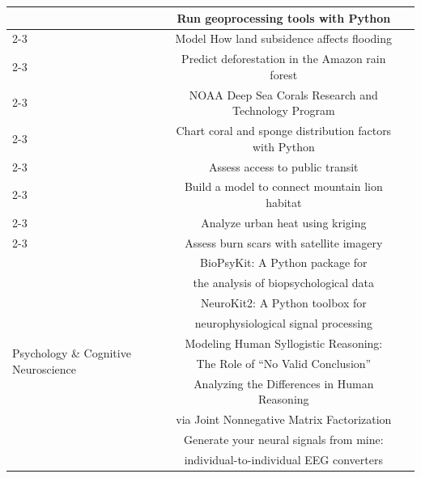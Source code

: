 \begin{table}[h]
\begin{tabular}{lcc}
 & Run geoprocessing tools with Python & \citet{Zandbergen_2024} \\
\cmidrule(lr){2-3}

 & Model How land subsidence affects flooding & \citet{Andeweg_Kuijpers_2024} \\
\cmidrule(lr){2-3}

 & Predict deforestation in the Amazon rain forest & \citet{ESRI_2024} \\
\cmidrule(lr){2-3}

 & NOAA Deep Sea Corals Research and Technology Program & \citet{hourigan-2023} \\
\cmidrule(lr){2-3}

 & Chart coral and sponge distribution factors with Python & \citet{Robinson_2023} \\
\cmidrule(lr){2-3}

 & Assess access to public transit & \citet{ESRI_2024b} \\
\cmidrule(lr){2-3}

 & Build a model to connect mountain lion habitat & \citet{ESRI_2024c} \\
\cmidrule(lr){2-3}

 & Analyze urban heat using kriging & \citet{Krause_2024} \\
\cmidrule(lr){2-3}

 & Assess burn scars with satellite imagery & \citet{ESRI_2024d} \\

\midrule

\multirow{12}{*}{Psychology \& Cognitive Neuroscience} & BioPsyKit: A Python package for & \multirow{2}{*}{\citet{Richer2021}} \\
 & the analysis of biopsychological data & \\
\cmidrule(lr){2-3}

 & NeuroKit2: A Python toolbox for & \multirow{2}{*}{\citet{Makowski_NeuroKit2_A_Python_2021}} \\
 & neurophysiological signal processing & \\
\cmidrule(lr){2-3}

 & Modeling Human Syllogistic Reasoning: & \multirow{2}{*}{\citet{janeway_28584}} \\
 & The Role of ``No Valid Conclusion'' & \\
\cmidrule(lr){2-3}

 & Analyzing the Differences in Human Reasoning & \multirow{2}{*}{\citet{janeway_30139}} \\
 & via Joint Nonnegative Matrix Factorization & \\
\cmidrule(lr){2-3}

 & Generate your neural signals from mine: & \multirow{2}{*}{\citet{lu2023eeg2eeg}} \\
 & individual-to-individual EEG converters & \\

\bottomrule
\end{tabular}


\vspace{-11pt}
\label{tab:pubs_geopsy}
\end{table}